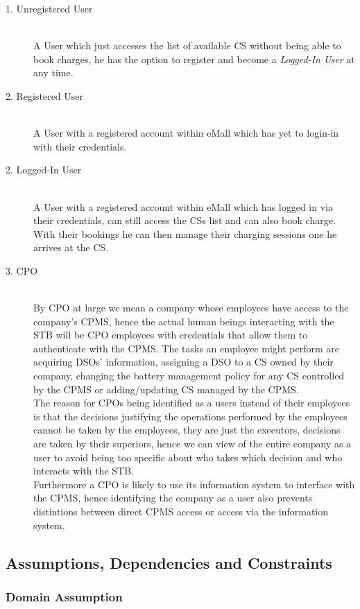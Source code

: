 \documentclass[11pt]{article}
\begin{document}
\begin{description}
    \item [1. Unregistered User] \hfill \\
        A User which just accesses the list of available CS without being able to book charges, he has the option to register and become a \textit{Logged-In User} at any time.
    \item [2. Registered User] \hfill \\
        A User with a registered account within eMall which has yet to login-in with their credentials.
    \item [2. Logged-In User] \hfill \\
        A User with a registered account within eMall which has logged in via their credentials, can still access the CSs list and can also book charge. With their bookings he can then manage their charging sessions one he arrives at the CS.
    \item [3. CPO] \hfill \\
        By CPO at large we mean a company whose employees have access to the company's CPMS, hence the actual human beings interacting with the STB will be CPO employees with credentials that allow them to authenticate with the CPMS. The tasks an employee might perform are acquiring DSOs' information, assigning a DSO to a CS owned by their company, changing the battery management policy for any CS controlled by the CPMS or adding/updating CS managed by the CPMS. \\
        The reason for CPOs being identified as a users instead of their employees is that the decisions justifying the operations performed by the employees cannot be taken by the employees, they are just the executors, decisions are taken by their superiors, hence we can view of the entire company as a user to avoid being too specific about who takes which decision and who interacts with the STB. \\
        Furthermore a CPO is likely to use its information system to interface with the CPMS, hence identifying the company as a user also prevents distintions between direct CPMS access or access via the information system.
\end{description}

\subsection{Assumptions, Dependencies and Constraints}

\subsubsection{Domain Assumption}
\end{document}
